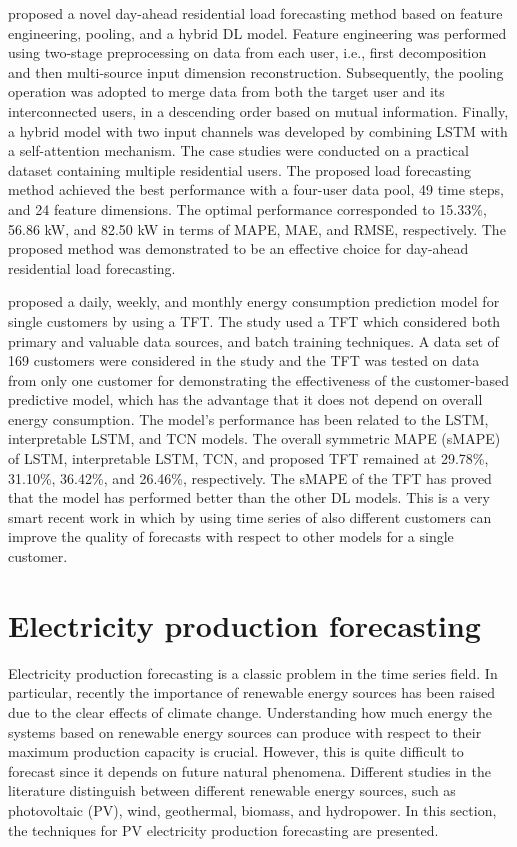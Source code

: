 \cite{ZANG2021120682} proposed a novel day-ahead residential load forecasting method based on feature engineering, pooling, and a hybrid DL model.
Feature engineering was performed using two-stage preprocessing on data from each user, i.e., first decomposition and then multi-source input dimension reconstruction.
Subsequently, the pooling operation was adopted to merge data from both the target user and its interconnected users, in a descending order based on mutual information.
Finally, a hybrid model with two input channels was developed by combining LSTM with a self-attention mechanism.
The case studies were conducted on a practical dataset containing multiple residential users.
The proposed load forecasting method achieved the best performance with a four-user data pool, 49 time steps, and 24 feature dimensions.
The optimal performance corresponded to 15.33\%, 56.86 kW, and 82.50 kW in terms of MAPE, MAE, and RMSE, respectively.
The proposed method was demonstrated to be an effective choice for day-ahead residential load forecasting.

\cite{NAZIR2023100888} proposed a daily, weekly, and monthly energy consumption prediction model for single customers by using a TFT.
The study used a TFT which considered both primary and valuable data sources, and batch training techniques.
A data set of 169 customers were considered in the study and the TFT was tested on data from only one customer for demonstrating the effectiveness of the customer-based predictive model, which has the advantage that it does not depend on overall energy consumption.
The model’s performance has been related to the LSTM, interpretable LSTM, and TCN models.
The overall symmetric MAPE (sMAPE) of LSTM, interpretable LSTM, TCN, and proposed TFT remained at 29.78\%, 31.10\%, 36.42\%, and 26.46\%, respectively.
The sMAPE of the TFT has proved that the model has performed better than the other DL models.
This is a very smart recent work in which by using time series of also different customers can improve the quality of forecasts with respect to other models for a single customer.


\section{Electricity production forecasting}
\label{sec:productionsoa}
\vspace{0.2 cm}

Electricity production forecasting is a classic problem in the time series field.
In particular, recently the importance of renewable energy sources has been raised due to the clear effects of climate change.
Understanding how much energy the systems based on renewable energy sources can produce with respect to their maximum production capacity is crucial.
However, this is quite difficult to forecast since it depends on future natural phenomena.
Different studies in the literature distinguish between different renewable energy sources, such as photovoltaic (PV), wind, geothermal, biomass, and hydropower.
In this section, the techniques for PV electricity production forecasting are presented.

